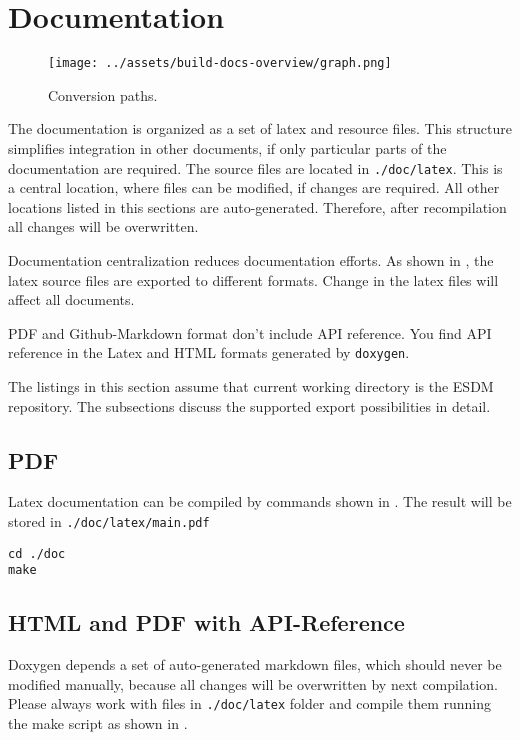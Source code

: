 \section{Documentation}

\begin{figure}[!ht]
  \begin{center}
    \texttt{[image: ../assets/build-docs-overview/graph.png]}
  \end{center}
  \caption{Conversion paths.}
  \label{fig:build-docs-overview}
\end{figure}

The documentation is organized as a set of latex and resource files.
This structure simplifies integration in other documents, if only particular parts of the documentation are required.
The source files are located in \lstinline|./doc/latex|.
This is a central location, where files can be modified, if changes are required.
All other locations listed in this sections are auto-generated.
Therefore, after recompilation all changes will be overwritten.

Documentation centralization reduces documentation efforts.
As shown in , the latex source files are exported to different formats.
Change in the latex files will affect all documents.

PDF and Github-Markdown format don't include API reference.
You find API reference in the Latex and HTML formats generated by \lstinline|doxygen|.

The listings in this section assume that current working directory is the ESDM repository.
The subsections discuss the supported export possibilities in detail.

\subsection{PDF}
Latex documentation can be compiled by commands shown in .
The result will be stored in \lstinline|./doc/latex/main.pdf|

\begin{lstlisting}[caption={Make PDF document},label={code:doc:latex}]
cd ./doc
make
\end{lstlisting}


\subsection{HTML and PDF with API-Reference}
Doxygen depends a set of auto-generated markdown files, which should never be modified manually, because all changes will be overwritten by next compilation.
Please always work with files in \lstinline|./doc/latex| folder and compile them running the make script as shown in .

